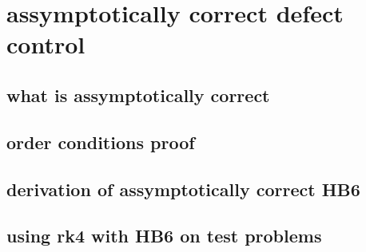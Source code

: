 \section{assymptotically correct defect control}
\subsection{what is assymptotically correct}
\subsection{order conditions proof}
\subsection{derivation of assymptotically correct HB6}
\subsection{using rk4 with HB6 on test problems}